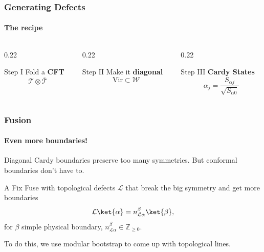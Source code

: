 \documentclass[aspectratio=169]{beamer}
\begin{document}
\begin{frame}
  \frametitle{Generating Defects}
  \framesubtitle{The recipe}
  \vfill
  \begin{columns}[c]
    \begin{column}{0.22\textwidth}
      \begin{block}{Step I}
        \footnotesize
        Fold a \textbf{CFT}
        \[
          \mathcal{T} \otimes \overline{\mathcal{T}}
        \]
      \end{block}
    \end{column}
    \pause
    \begin{column}{0.22\textwidth}
      \begin{block}{Step II}
        \footnotesize
        Make it \textbf{diagonal}
        \[
          \mathrm{Vir} \subset \mathcal{W}
        \]
      \end{block}
    \end{column}
    \pause
    \begin{column}{0.22\textwidth}
      \begin{block}{Step III}
        \footnotesize
        \textbf{Cardy States}
        \[
          \alpha_j = \dfrac{S_{\alpha j}}{\sqrt{S_{\alpha 0}}}
        \]
      \end{block}
    \end{column}
    \pause
  \end{columns}
  \vfill
\end{frame}

\begin{frame}
  \frametitle{Fusion}
  \framesubtitle{Even more boundaries!}
  Diagonal Cardy boundaries preserve too many symmetries. But conformal boundaries don't have to.\\[1ex]
  \pause
  \begin{block}{A Fix}
    Fuse with topological defects $\mathcal{L}$ that break the big symmetry and get more boundaries
    \begin{equation}
      \mathcal{L}\ket{\alpha} = n_{\mathcal{L}\alpha}^{\beta} \ket{\beta},
    \end{equation}
    for $\beta$ simple physical boundary, $n_{\mathcal{L} \alpha}^\beta \in \mathbb{Z}_{\geq 0}$.
  \end{block}
  To do this, we use modular bootstrap to come up with topological lines.
\end{frame}
\end{document}
